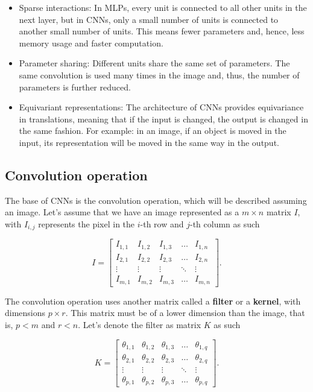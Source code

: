 \begin{itemize}
  \item Sparse interactions: In MLPs, every unit is connected to all other units in the next layer, but in CNNs, only a small number of units is connected to another small number of units. This means fewer parameters and, hence, less memory usage and faster computation.
  \item Parameter sharing: Different units share the same set of parameters. The same convolution is used many times in the image and, thus, the number of parameters is further reduced.
  \item Equivariant representations: The architecture of CNNs provides equivariance in translations, meaning that if the input is changed, the output is changed in the same fashion. For example: in an image, if an object is moved in the input, its representation will be moved in the same way in the output.
\end{itemize}

\subsection{Convolution operation}

The base of CNNs is the convolution operation, which will be described assuming an image. Let's assume that we have an image represented as a $m \times n$ matrix $I$, with $I_{i,j}$ represents the pixel in the $i$-th row and $j$-th column as such

$$
  I =
    \begin{bmatrix}
      I_{1,1} & I_{1,2} & I_{1,3} & \dots  & I_{1,n} \\
      I_{2,1} & I_{2,2} & I_{2,3} & \dots  & I_{2,n} \\
      \vdots & \vdots & \vdots & \ddots & \vdots \\
      I_{m,1} & I_{m,2} & I_{m,3} & \dots  & I_{m,n}
    \end{bmatrix}.
$$

The convolution operation uses another matrix called a \textbf{filter} or a \textbf{kernel}, with dimensions $p \times r$. This matrix must be of a lower dimension than the image, that is, $p < m$ and $r < n$. Let's denote the filter as matrix $K$ as such

$$
  K =
    \begin{bmatrix}
      \theta_{1,1} & \theta_{1,2} & \theta_{1,3} & \dots  & \theta_{1,q} \\
      \theta_{2,1} & \theta_{2,2} & \theta_{2,3} & \dots  & \theta_{2,q} \\
      \vdots & \vdots & \vdots & \ddots & \vdots \\
      \theta_{p,1} & \theta_{p,2} & \theta_{p,3} & \dots  & \theta_{p,q}
    \end{bmatrix}.
$$

